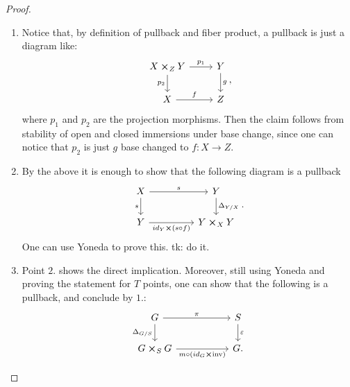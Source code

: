 \documentclass[../Main]{subfiles}
\begin{document}
\begin{proof}\leavevmode\vspace{-.2\baselineskip}
\begin{enumerate}
\item Notice that, by definition of pullback and fiber product, a pullback is just
		a diagram like:
	\begin{equation}
	\begin{tikzcd}
		X \cross_{ Z } Y \arrow[r, "p_1", rightarrow] \arrow[d, "p_2"', rightarrow] &
		Y \arrow[d, "g", rightarrow] \\
		X \arrow[r, "f", rightarrow] &
		Z
	\end{tikzcd}
	,\end{equation}
	where $p_1$ and $p_2$ are the projection morphisms.
	Then the claim follows from stability of open and closed immersions under base change, 
	since one can notice that $p_2$ is just $g$ base changed to $f\colon X \to Z$.

\item By the above it is enough to show that the following diagram is a pullback
	\begin{equation}
	\begin{tikzcd}[column sep=4.6em]
		X \arrow[r, "s", rightarrow] \arrow[d, "s"', rightarrow] &
		Y \arrow[d, "\Delta_{Y/X}", rightarrow] \\
		Y \arrow[r, "id_{Y} \cross {(s \circ f)}"', rightarrow] &
		Y \cross_{ X } Y
	\end{tikzcd}
	.\end{equation} 
	One can use Yoneda to prove this.
	tk: do it.

\item Point $2.$ shows the direct implication.
	Moreover, still using Yoneda and proving the statement for $T$ points,
	one can show that the following is a pullback, and conclude by $1.$:
	\begin{equation}
	\begin{tikzcd}[column sep=5.4em]
		G \arrow[r, "\pi", rightarrow] \arrow[d, "\Delta_{G/S}"', rightarrow] &
		S \arrow[d, "\varepsilon", rightarrow] \\
		G \cross_{ S } G \arrow[r, "m \circ {(id_G \cross \mathrm{inv})}"', rightarrow] &
		G.
	\end{tikzcd}\qedhere
	\end{equation} 
\end{enumerate}
\end{proof}
\end{document}
